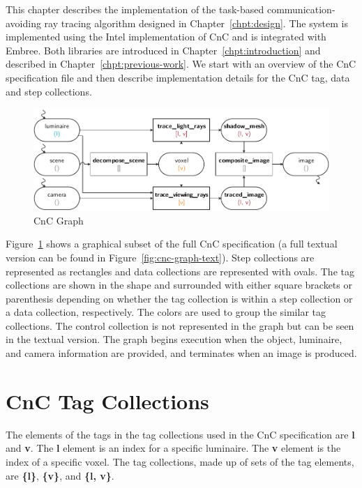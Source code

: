 \label{chpt:implementation}

This chapter describes the implementation of the task-based 
communication-avoiding ray tracing algorithm designed in 
Chapter~\ref{chpt:design}. The system is implemented using the Intel 
implementation of CnC and is integrated with Embree.  Both libraries are 
introduced in Chapter~\ref{chpt:introduction} and described in
Chapter~\ref{chpt:previous-work}. We start with an overview of the CnC
specification file and then describe implementation details for the CnC tag,
data and step collections.

\begin{figure}[!htb]
  \centering
  \includegraphics[width=\textwidth]{drawings/CnC.pdf}
  \caption{CnC Graph}
  \label{fig:cnc}
\end{figure}

Figure~\ref{fig:cnc} shows a graphical subset of the full CnC specification (a
full textual version can be found in Figure~\ref{fig:cnc-graph-text}).  Step 
collections are represented as rectangles and data collections are represented
with ovals.  The tag collections are shown in the shape and surrounded with 
either square brackets or parenthesis depending on whether the tag collection is 
within a step collection or a data collection, respectively.  The colors are 
used to group the similar tag collections. The control collection is not 
represented in the graph but can be seen in the textual version. The graph 
begins execution when the object, luminaire, and camera information are
provided, and terminates when an image is produced.

\section{CnC Tag Collections}
\label{sec:tag-collections}
The elements of the tags in the tag collections used in the CnC specification
are \textbf{l} and \textbf{v}.  The \textbf{l} element is an index for a
specific luminaire.  The \textbf{v} element is the index of a specific voxel.
The tag collections, made up of sets of the tag elements, are 
\textbf{\{l\}}, \textbf{\{v\}}, and \textbf{\{l, v\}}.

